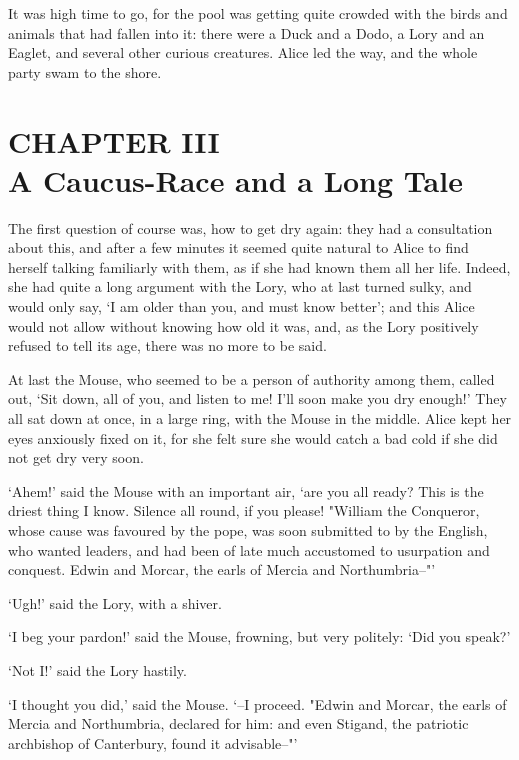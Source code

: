 \documentclass{article}
\begin{document}
It was high time to go, for the pool was getting quite crowded with the birds and animals that had fallen into it: there were a Duck and a Dodo, a Lory and an Eaglet, and several other curious creatures. Alice led the way, and the whole party swam to the shore.

\newpage

\section*{CHAPTER III \\ A Caucus-Race and a Long Tale}


The first question of course was, how to get dry again: they had a consultation about this, and after a few minutes it seemed quite natural to Alice to find herself talking familiarly with them, as if she had known them all her life. Indeed, she had quite a long argument with the Lory, who at last turned sulky, and would only say, `I am older than you, and must know better'; and this Alice would not allow without knowing how old it was, and, as the Lory positively refused to tell its age, there was no more to be said.

At last the Mouse, who seemed to be a person of authority among them, called out, `Sit down, all of you, and listen to me! I'll soon make you dry enough!' They all sat down at once, in a large ring, with the Mouse in the middle. Alice kept her eyes anxiously fixed on it, for she felt sure she would catch a bad cold if she did not get dry very soon.

`Ahem!' said the Mouse with an important air, `are you all ready? This is the driest thing I know. Silence all round, if you please! "William the Conqueror, whose cause was favoured by the pope, was soon submitted to by the English, who wanted leaders, and had been of late much accustomed to usurpation and conquest. Edwin and Morcar, the earls of Mercia and Northumbria--"'

`Ugh!' said the Lory, with a shiver.

`I beg your pardon!' said the Mouse, frowning, but very politely: `Did you speak?'

`Not I!' said the Lory hastily.

`I thought you did,' said the Mouse. `--I proceed. "Edwin and Morcar, the earls of Mercia and Northumbria, declared for him: and even Stigand, the patriotic archbishop of Canterbury, found it advisable--"'
\end{document}
